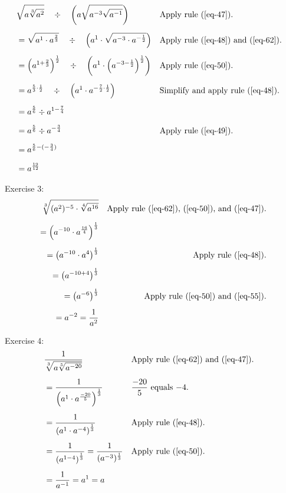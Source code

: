 \begin{align*}
    &\sqrt{a \sqrt[3]{a^2}} \quad \div \quad \left(a\sqrt{a^{-3}\sqrt{a^{-1}}}\right)&&\text{Apply rule \bref{eq-47}.}&\\[1.25ex]
    &= \sqrt{a^1 \cdot a^{\frac{2}{3}}} \quad \div \quad \left(a^1 \cdot \sqrt{a^{-3} \cdot a^{-\frac{1}{2}}}\right) &&\text{Apply rule \bref{eq-48} and \bref{eq-62}.}&\\[1.25ex]
    &= \left(a^{1+\frac{2}{3}}\right)^\frac{1}{2} \quad \div \quad \left(a^1 \cdot \left(a^{-3-\frac{1}{2}}\right)^\frac{1}{2}\right)&&\text{Apply rule \bref{eq-50}.}&\\[1.25ex]
    &= a^{\frac{5}{3}\cdot \frac{1}{2}} \quad \div \quad \left(a^1 \cdot a^{-\frac{7}{2}\cdot \frac{1}{2}}\right)&&\text{Simplify and apply rule \bref{eq-48}.}&\\[1.25ex]
    &= a^{\frac{5}{6}} \div a^{1-\frac{7}{4}}&\\[1.25ex]
    &= a^{\frac{5}{6}} \div a^{-\frac{3}{4}}&&\text{Apply rule \bref{eq-49}.}&\\[1.25ex]
    &= a^{\frac{5}{6}-(-\frac{3}{4})}&\\[1.25ex]
    &= a^{\frac{19}{12}}
\end{align*}

Exercise 3: 
\begin{align*}
    \sqrt[3]{(a^2)^{-5} \cdot \sqrt[4]{a^{16}}} &&\text{Apply rule \bref{eq-62}, \bref{eq-50}, and \bref{eq-47}.}&\\[1.25ex]
    = \left(a^{-10} \cdot a^{\frac{16}{4}}\right)^{\frac{1}{3}}&\\[1.25ex]
    = \left(a^{-10} \cdot a^4\right)^{\frac{1}{3}}&&\text{Apply rule \bref{eq-48}.}&\\[1.25ex]
    = \left(a^{-10+4}\right)^{\frac{1}{3}}&\\[1.25ex]
    = \left(a^{-6}\right)^{\frac{1}{3}}&&\text{Apply rule \bref{eq-50} and \bref{eq-55}.}&\\[1.25ex]
    = a^{-2}
    = \frac{1}{a^2}
\end{align*}

Exercise 4:
\begin{align*}
    &\frac{1}{\sqrt[3]{a\sqrt[5]{a^{-20}}}} &&\text{Apply rule \bref{eq-62} and \bref{eq-47}.}&\\[1.25ex]
    &= \frac{1}{\left(a^1 \cdot a^{\frac{-20}{5}}\right)^{\frac{1}{3}}}&&\text{$\frac{-20}{5}$ equals $-4$.}&\\[1.25ex]
    &= \frac{1}{\left(a^1 \cdot a^{-4}\right)^{\frac{1}{3}}}&&\text{Apply rule \bref{eq-48}.}&\\[1.25ex]
    &= \frac{1}{\left(a^{1-4}\right)^{\frac{1}{3}}}
    = \frac{1}{(a^{-3})^{\frac{1}{3}}} &&\text{Apply rule \bref{eq-50}.}&\\[1.25ex]
    &= \frac{1}{a^{-1}} = a^1 = a
\end{align*}

